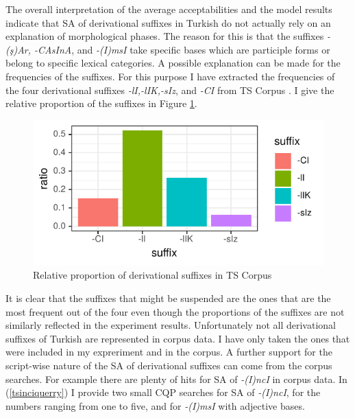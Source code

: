 The overall interpretation of the average acceptabilities and the model results indicate that SA of derivational suffixes in Turkish do not actually rely on an explanation of morphological phases. The reason for this is that the suffixes \textit{-(ş)Ar, -CAsInA}, and \textit{-(I)msI} take specific bases which are participle forms or belong to specific lexical categories. A possible explanation can be made for the frequencies of the suffixes. For this purpose I have extracted the frequencies of the four derivational suffixes \textit{-lI,-lIK,-sIz}, and \textit{-CI} from TS Corpus \citep{sezer2013ts}. I give the relative proportion of the suffixes in Figure \ref{fig:suffixcorpus}.


\begin{knitrout}
\color{fgcolor}\begin{figure}[hbt!]

{\centering \includegraphics[]{figure/suffixcorpus-1} 

}

\caption[Relative proportion of derivational suffixes in TS Corpus]{Relative proportion of derivational suffixes in TS Corpus}\label{fig:suffixcorpus}
\end{figure}


\end{knitrout}

It is clear that the suffixes that might be suspended are the ones that are the most frequent out of the four even though the proportions of the suffixes are not similarly reflected in the experiment results. Unfortunately not all derivational suffixes of Turkish are represented in corpus data. I have only taken the ones that were included in my expreriment and in the corpus. A further support for the script-wise nature of the SA of derivational suffixes can come from the corpus searches. For example there are plenty of hits for SA of \textit{-(I)ncI} in corpus data. In (\ref{tsinciquerry}) I provide two small CQP searches \citep{hardie2012cqpweb} for SA of \textit{-(I)ncI}, for the numbers ranging from one to five, and for \textit{-(I)msI} with adjective bases. 

